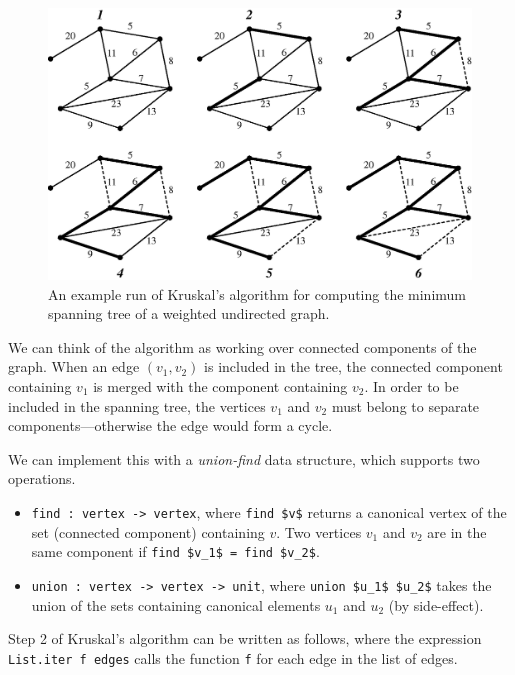 \begin{figure}
\centerline{\includegraphics[scale=0.6]{kruskal}}
\caption{An example run of Kruskal's algorithm for computing the minimum spanning tree of a weighted undirected graph.}
\label{figure:kruskal}
\end{figure}

We can think of the algorithm as working over connected components of the graph.  When an edge
$(v_1, v_2)$ is included in the tree, the connected component containing $v_1$ is merged with the
component containing $v_2$.  In order to be included in the spanning tree, the vertices $v_1$ and
$v_2$ must belong to separate components---otherwise the edge would form a cycle.

We can implement this with a \emph{union-find} data structure, which supports two operations.

\begin{itemize}
\item
\lstinline/find : vertex -> vertex/,
where \hbox{\lstinline/find $v$/} returns a canonical vertex of the set (connected component) containing
$v$.  Two vertices $v_1$ and $v_2$ are in the same component if \hbox{\lstinline/find $v_1$ = find $v_2$/}.
\item
\lstinline/union : vertex -> vertex -> unit/,
where \hbox{\lstinline/union $u_1$ $u_2$/} takes the union of the sets containing canonical elements $u_1$ and $u_2$ (by side-effect).
\end{itemize}
%
Step 2 of Kruskal's algorithm can be written as follows, where the expression
%
\hbox{\lstinline/List.iter f edges/} calls the function \hbox{\lstinline/f/} for each edge in the list of edges.


